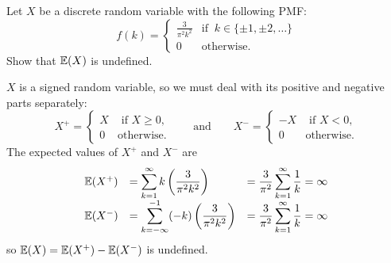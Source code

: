 \begin{example} %
Let $X$ be a discrete random variable with the following PMF:
\[
f(k) = \begin{cases}
	\displaystyle\frac{3}{\pi^2 k^2} 	& \text{if }\ k\in\{\pm 1,\pm 2, \ldots\} \\[1ex]
	0						& \text{otherwise.}
\end{cases}	
\]
Show that $\mathbb{E}(X)$ is undefined.
\begin{solution}
$X$ is a signed random variable, so we must deal with its positive and negative parts separately:
\[
X^{+}	= \begin{cases}  X & \text{ if } X \geq 0, \\ 0 & \text{otherwise.}\end{cases}
\qquad\text{and}\qquad
X^{-}	= \begin{cases} -X & \text{ if } X <    0, \\ 0 & \text{otherwise.}\end{cases}
\]
The expected values of $X^{+}$ and $X^{-}$ are
\[\begin{array}{lll}
\mathbb{E}(X^{+})	
	& = \displaystyle \sum_{k=1}^{\infty} k \left(\frac{3}{\pi^2 k^2}\right)
	& = \displaystyle \frac{3}{\pi^2} \sum_{k=1}^{\infty}\frac{1}{k} = \infty \\[2ex]
\mathbb{E}(X^{-})	
	& = \displaystyle \sum_{k=-\infty}^{-1} (-k) \left(\frac{3}{\pi^2 k^2}\right)
	& = \displaystyle \frac{3}{\pi^2} \sum_{k=1}^{\infty}\frac{1}{k} = \infty \\
\end{array}\]
so $\mathbb{E}(X) = \mathbb{E}(X^{+}) - \mathbb{E}(X^{-})$ is undefined.
\end{solution}
\end{example}

